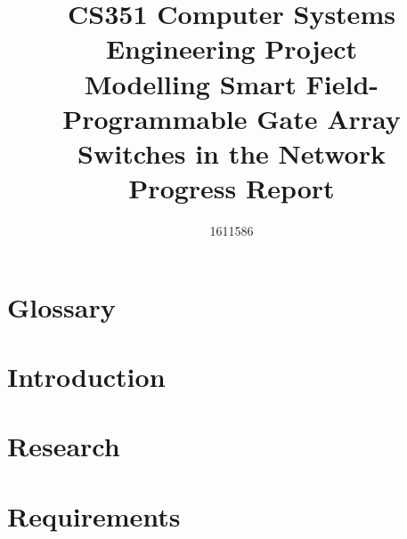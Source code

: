 \documentclass[
  12pt,
  a4paper,
  twoside,
  onecolumn,
  appendixprefix=true,
  toc=chapterentrywithdots,
  toc=bibliography,
  abstract=true,
  toc=listof
]{scrreprt}
\title{CS351 Computer Systems Engineering Project \\ \vspace{0.5cm} Modelling Smart Field-Programmable Gate Array Switches in the Network \\ \vspace{0.3cm} \Large{Progress Report}}
\author{1611586}
\begin{document}
\renewcommand{\sfdefault}{cmr}




\onehalfspacing
{}

\begin{abstract}
  
\end{abstract}

\let\oldcleardoublepage\cleardoublepage
\let\cleardoublepage\clearpage

\renewcommand{\abstractname}{Keywords}
\begin{abstract}
  
\end{abstract}

\renewcommand{\abstractname}{Acknowledgements}
\begin{abstract}
  
\end{abstract}

\let\cleardoublepage\oldcleardoublepage

\tableofcontents

\listoffigures

\listoftables

{}
\chapter*{Glossary}
\label{glossary}


\newpage


\chapter{Introduction}
\label{introduction}


\chapter{Research}
\label{research}


\chapter{Requirements}
\label{requirements}

\end{document}
